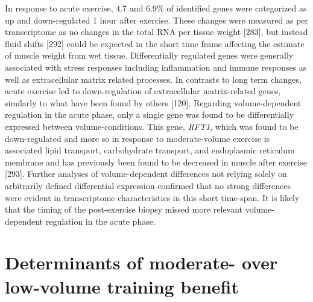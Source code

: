 \documentclass[twoside,10pt]{gihclass} %
\begin{document}
In response to acute exercise, 4.7 and 6.9\% of identified genes were categorized as up and down-regulated 1 hour after exercise.
These changes were measured as per transcriptome as no changes in the total RNA per tissue weight
{[}283{]},
but instead fluid shifts {[}292{]}
could be expected in the short time frame affecting the estimate of muscle weight from wet tissue.
Differentially regulated genes were generally associated with stress responses including inflammation and immune responses as well as extracellular matrix related processes. In contrasts to long term changes, acute exercise led to down-regulation of extracellular matrix-related genes, similarly to what have been found by others {[}120{]}.
Regarding volume-dependent regulation in the acute phase, only a single gene was found to be differentially expressed between volume-conditions. This gene, \emph{RFT1}, which was found to be down-regulated and more so in response to moderate-volume exercise is associated lipid transport, carbohydrate transport, and endoplasmic reticulum membrane and has previously been found to be decreased in muscle after exercise {[}293{]}.
Further analyses of volume-dependent differences not relying solely on arbitrarily defined differential expression confirmed that no strong differences were evident in transcriptome characteristics in this short time-span.
It is likely that the timing of the post-exercise biopsy missed more relevant volume-dependent regulation in the acute phase.

\hypertarget{determinants-of-moderate--over-low-volume-training-benefit}{%
\section{Determinants of moderate- over low-volume training benefit}\label{determinants-of-moderate--over-low-volume-training-benefit}}
\end{document}
